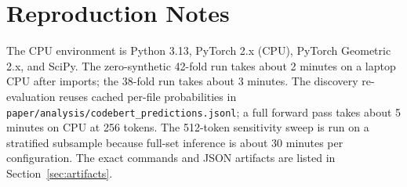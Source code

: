 \documentclass[conference,10pt]{IEEEtran}
\begin{document}
\section{Reproduction Notes}
\label{app:repro}

The CPU environment is Python 3.13, PyTorch 2.x (CPU), PyTorch Geometric 2.x, and SciPy. The
zero-synthetic 42-fold run takes about 2 minutes on a laptop CPU after imports; the 38-fold run
takes about 3 minutes. The discovery re-evaluation reuses cached per-file probabilities in
\texttt{paper/analysis/codebert\_predictions.jsonl}; a full forward pass takes about 5 minutes on
CPU at 256 tokens. The 512-token sensitivity sweep is run on a stratified subsample because
full-set inference is about 30 minutes per configuration. The exact commands and JSON artifacts
are listed in Section~\ref{sec:artifacts}.



\end{document}
